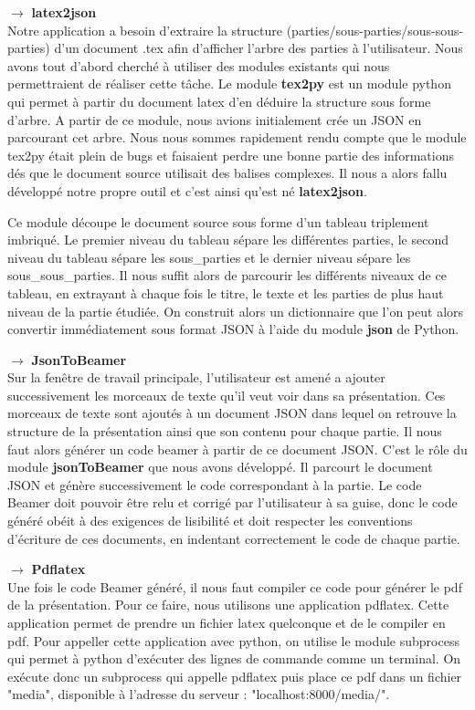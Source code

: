 \documentclass[12pt]{article}
\begin{document}
\noindent
$\longrightarrow$ \textbf{latex2json}\\
Notre application a besoin d'extraire la structure (parties/sous-parties/sous-sous-parties) d'un document .tex afin d'afficher l'arbre des parties à l'utilisateur. Nous avons tout d'abord cherché à utiliser des modules existants qui nous permettraient de réaliser cette tâche. Le module \textbf{tex2py} est un module python qui permet à partir du document latex d'en déduire la structure sous forme d'arbre. A partir de ce module, nous avions initialement crée un JSON en parcourant cet arbre. Nous nous sommes rapidement rendu compte que le module tex2py était plein de bugs et faisaient perdre une bonne partie des informations dés que le document source utilisait des balises complexes. Il nous a alors fallu développé notre propre outil et c'est ainsi qu'est né \textbf{latex2json}.

Ce module découpe le document source sous forme d'un tableau triplement imbriqué. Le premier niveau du tableau sépare les différentes parties, le second niveau du tableau sépare les sous\_parties et le dernier niveau sépare les sous\_sous\_parties. Il nous suffit alors de parcourir les différents niveaux de ce tableau, en extrayant à chaque fois le titre, le texte et les parties de plus haut niveau de la partie étudiée. On construit alors un dictionnaire que l'on peut alors convertir immédiatement sous format JSON à l'aide du module \textbf{json} de Python.

\noindent
$\longrightarrow$ \textbf{JsonToBeamer}\\
Sur la fenêtre de travail principale, l'utilisateur est amené a ajouter successivement les morceaux de texte qu'il veut voir dans sa présentation. Ces morceaux de texte sont ajoutés à un document JSON dans lequel on retrouve la structure de la présentation ainsi que son contenu pour chaque partie. Il nous faut alors générer un code beamer à partir de ce document JSON. C'est le rôle du module \textbf{jsonToBeamer} que nous avons développé. Il parcourt le document JSON et génère successivement le code correspondant à la partie. Le code Beamer doit pouvoir être relu et corrigé par l'utilisateur à sa guise, donc le code généré obéit à des exigences de lisibilité et doit respecter les conventions d'écriture de ces documents, en indentant correctement le code de chaque partie.

\noindent
$\longrightarrow$ \textbf{Pdflatex}\\
Une fois le code Beamer généré, il nous faut compiler ce code pour générer le pdf de la présentation. Pour ce faire, nous utilisons une application pdflatex. Cette application permet de prendre un fichier latex quelconque et de le compiler en pdf. Pour appeller cette application avec python, on utilise le module subprocess qui permet à python d'exécuter des lignes de commande comme un terminal. On exécute donc un subprocess qui appelle pdflatex puis place ce pdf dans un fichier "media", disponible à l'adresse du serveur : "localhost:8000/media/".
\end{document}
